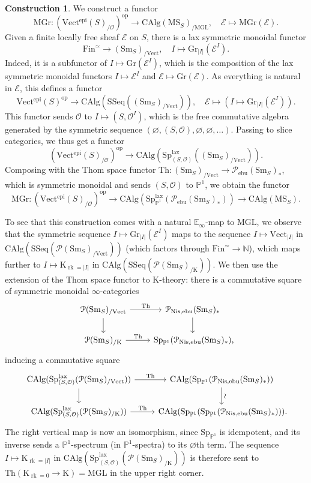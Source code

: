 \documentclass{amsart}
\numberwithin{equation}{section}
\theoremstyle{plain}
\theoremstyle{definition}
\newtheorem{construction}[equation]{Construction}
\let\scr=\mathcal
\let\bb=\mathbb
\def\N{\bb N}
\def\P{\bb P}
\let\emptyset=\varnothing
\def\Th{\mathrm{Th}}
\def\E{\mathbb{E}}
\def\SSeq{\mathrm{SSeq}}
\DeclareMathOperator{\rk}{rk}
\def\Nis{\mathrm{Nis}}
\let\cat=\mathrm
\def\Gr{\mathrm{Gr}{}}
\def\MGL{\mathrm{MGL}}
\def\MGr{\mathrm{MGr}}
\def\K{\mathrm{K}{}}
\def\Sm{{\cat{S}\mathrm{m}}}
\def\Fin{\cat F\mathrm{in}}
\def\op{\mathrm{op}}
\def\Vect{\cat{V}\mathrm{ect}{}}
\def\MS{\mathrm{MS}}
\def\Sp{\mathrm{Sp}}
\def\CAlg{\mathrm{CAlg}{}}
\def\epi{\mathrm{epi}}
\def\ebu{\mathrm{ebu}}
\begin{document}
\begin{construction}
	\label{ctr:MGr}
	We construct a functor
	\[
	\MGr\colon (\Vect^\epi(S)_{/\scr O})^\op \to \CAlg(\MS_S)_{/\MGL},\quad\scr E\mapsto \MGr(\scr E).
	\]
	Given a finite locally free sheaf $\scr E$ on $S$, there is a lax symmetric monoidal functor
	\[
	\Fin^\simeq\to(\Sm_S)_{/\Vect}, \quad I\mapsto \Gr_{\lvert I\rvert}(\scr E^I).
	\]
	Indeed, it is a subfunctor of $I\mapsto \Gr(\scr E^I)$, which is the composition of the lax symmetric monoidal functors $I\mapsto\scr E^I$ and $\scr E\mapsto\Gr(\scr E)$. As everything is natural in $\scr E$, this defines a functor
	\begin{equation*}\label{eqn:MGr}
	\Vect^\epi(S)^\op \to \CAlg(\SSeq((\Sm_S)_{/\Vect})),\quad \scr E\mapsto (I\mapsto \Gr_{\lvert I\rvert}(\scr E^I)).
	\end{equation*}
	This functor sends $\scr O$ to $I\mapsto (S,\scr O^I)$, which is the free commutative algebra generated by the symmetric sequence $(\emptyset,(S,\scr O),\emptyset,\emptyset,\dotsc)$. Passing to slice categories, we thus get a functor
	\[
	(\Vect^\epi(S)_{/\scr O})^\op \to \CAlg(\Sp^\mathrm{lax}_{(S,\scr O)}((\Sm_S)_{/\Vect})).
	\]
	Composing with the Thom space functor $\Th\colon (\Sm_S)_{/\Vect}\to \scr P_\ebu(\Sm_S)_*$, which is symmetric monoidal \cite[Section 3]{AHI} and sends $(S,\scr O)$ to $\P^1$, we obtain the functor
	\[
	\MGr\colon (\Vect^\epi(S)_{/\scr O})^\op \to \CAlg(\Sp^\mathrm{lax}_{\P^1}(\scr P_\ebu(\Sm_S)_*))\to \CAlg(\MS_S).
	\]
	
	To see that this construction comes with a natural $\E_\infty$-map to $\MGL$, we observe that the symmetric sequence $I\mapsto \Gr_{\lvert I\rvert}(\scr E^I)$ maps to the sequence $I\mapsto\Vect_{\lvert I\rvert}$ in $\CAlg(\SSeq(\scr P(\Sm_S)_{/\Vect}))$ (which factors through $\Fin^\simeq\to\N$), which maps further to $I\mapsto \K_{\rk=\lvert I\rvert}$ in $\CAlg(\SSeq(\scr P(\Sm_S)_{/\K}))$. We then use the extension of the Thom space functor to K-theory: there is a commutative square of symmetric monoidal $\infty$-categories
 \[
 \begin{tikzcd}
 \scr P(\Sm_S)_{/\Vect} \ar{r}{\Th} \ar{d} & \scr P_{\Nis,\ebu}(\Sm_S)_* \ar{d} \\
 \scr P(\Sm_S)_{/\K} \ar{r}{\Th}  &  \Sp_{\P^1}(\scr P_{\Nis,\ebu}(\Sm_S)_*)\rlap,
 \end{tikzcd}
 \]
 inducing a commutative square
 \[
 \begin{tikzcd}
 \CAlg(\Sp^\mathrm{lax}_{(S,\scr O)}(\scr P(\Sm_S)_{/\Vect})) \ar{r}{\Th} \ar{d} & \CAlg(\Sp_{\P^1}(\scr P_{\Nis,\ebu}(\Sm_S)_*)) \ar{d}[sloped]{\sim} \\
 \CAlg(\Sp^\mathrm{lax}_{(S,\scr O)}(\scr P(\Sm_S)_{/\K})) \ar{r}{\Th}  &  \CAlg(\Sp_{\P^1}(\Sp_{\P^1}(\scr P_{\Nis,\ebu}(\Sm_S)_*)))\rlap.
 \end{tikzcd}
 \]
 The right vertical map is now an isomorphism, since $\Sp_{\P^1}$ is idempotent, and its inverse sends a $\P^1$-spectrum (in $\P^1$-spectra) to its $\emptyset$th term. The sequence $I\mapsto \K_{\rk=\lvert I\rvert}$ in $\CAlg(\Sp^\mathrm{lax}_{(S,\scr O)}(\scr P(\Sm_S)_{/\K}))$ is therefore sent to $\Th(\K_{\rk=0}\to\K)=\MGL$ in the upper right corner.
\end{construction}
\end{document}
